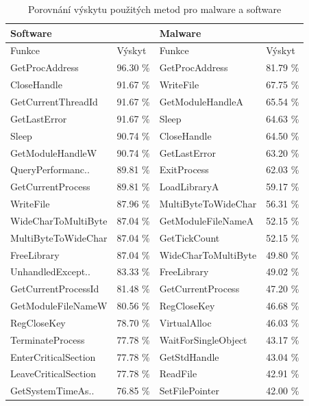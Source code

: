 \begin{table}[H]    
    \caption{Porovnání výskytu použitých metod pro malware a software}
    \label{table:methods_table}
    
    \centering
    \begin{tabular}{|l|l|l|l|}
        \hline
        \multicolumn{2}{|l|}{Software}   & \multicolumn{2}{|l|}{Malware}   \\  \hline
        Funkce               & Výskyt  & Funkce              & Výskyt  \\
        \hline
    	\hline
        GetProcAddress       & 96.30 \% & GetProcAddress      & 81.79 \% \\ \hline
        CloseHandle          & 91.67 \% & WriteFile           & 67.75 \% \\ \hline
        GetCurrentThreadId   & 91.67 \% & GetModuleHandleA    & 65.54 \% \\ \hline
        GetLastError         & 91.67 \% & Sleep               & 64.63 \% \\ \hline
        Sleep                & 90.74 \% & CloseHandle         & 64.50 \% \\ \hline
        GetModuleHandleW     & 90.74 \% & GetLastError        & 63.20 \% \\ \hline
        QueryPerformanc..    & 89.81 \% & ExitProcess         & 62.03 \% \\ \hline
        GetCurrentProcess    & 89.81 \% & LoadLibraryA        & 59.17 \% \\ \hline
        WriteFile            & 87.96 \% & MultiByteToWideChar & 56.31 \% \\ \hline
        WideCharToMultiByte  & 87.04 \% & GetModuleFileNameA  & 52.15 \% \\ \hline
        MultiByteToWideChar  & 87.04 \% & GetTickCount        & 52.15 \% \\ \hline
        FreeLibrary          & 87.04 \% & WideCharToMultiByte & 49.80 \% \\ \hline
        UnhandledExcept..    & 83.33 \% & FreeLibrary         & 49.02 \% \\ \hline
        GetCurrentProcessId  & 81.48 \% & GetCurrentProcess   & 47.20 \% \\ \hline
        GetModuleFileNameW   & 80.56 \% & RegCloseKey         & 46.68 \% \\ \hline
        RegCloseKey          & 78.70 \% & VirtualAlloc        & 46.03 \% \\ \hline
        TerminateProcess     & 77.78 \% & WaitForSingleObject & 43.17 \% \\ \hline
        EnterCriticalSection & 77.78 \% & GetStdHandle        & 43.04 \% \\ \hline
        LeaveCriticalSection & 77.78 \% & ReadFile            & 42.91 \% \\ \hline
        GetSystemTimeAs..    & 76.85 \% & SetFilePointer      & 42.00 \% \\ \hline
    \end{tabular}
\end{table}


